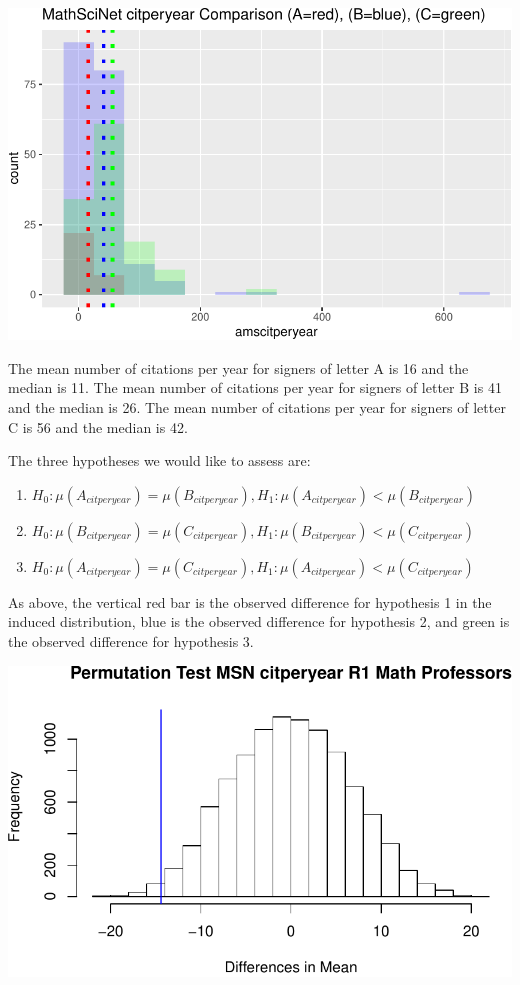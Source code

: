 \documentclass[]{article}
\begin{document}
\includegraphics{index_files/figure-latex/unnamed-chunk-14-1.pdf}

The mean number of citations per year for signers of letter A is 16 and
the median is 11. The mean number of citations per year for signers of
letter B is 41 and the median is 26. The mean number of citations per
year for signers of letter C is 56 and the median is 42.

The three hypotheses we would like to assess are:

\begin{enumerate}
\def\labelenumi{\arabic{enumi}.}
\item
  \(H_0: \mu(A_{citperyear}) = \mu(B_{citperyear}), H_1: \mu(A_{citperyear}) < \mu(B_{citperyear})\)
\item
  \(H_0: \mu(B_{citperyear}) = \mu(C_{citperyear}), H_1: \mu(B_{citperyear}) < \mu(C_{citperyear})\)
\item
  \(H_0: \mu(A_{citperyear}) = \mu(C_{citperyear}), H_1: \mu(A_{citperyear}) < \mu(C_{citperyear})\)
\end{enumerate}

As above, the vertical red bar is the observed difference for hypothesis
1 in the induced distribution, blue is the observed difference for
hypothesis 2, and green is the observed difference for hypothesis 3.

\includegraphics{index_files/figure-latex/unnamed-chunk-16-1.pdf}
\end{document}
